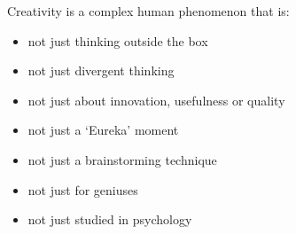 Creativity is a complex human phenomenon that is:

\begin{itemize}
  \item not just thinking outside the box
  \item not just divergent thinking
  \item not just about innovation, usefulness or quality
  \item not just a `Eureka' moment
  \item not just a brainstorming technique
  \item not just for geniuses
  \item not just studied in psychology
\end{itemize}








%


